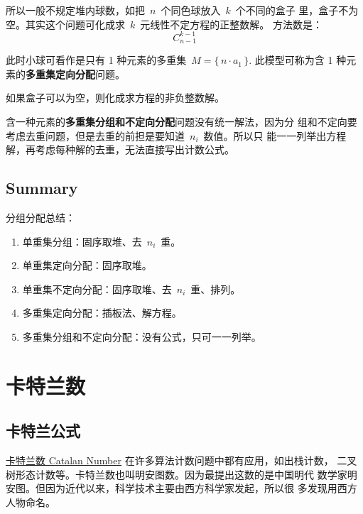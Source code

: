 所以一般不规定堆内球数，如把~$n$~个同色球放入~$k$~个不同的盒子
里，盒子不为空。其实这个问题可化成求~$k$~元线性不定方程的正整数解。
方法数是：
\[ C_{n - 1}^{k - 1}\]

此时小球可看作是只有 1 种元素的多重集~$M = \{\, n \cdot a_1\, \}$.
此模型可称为含 1 种元素的\textbf{多重集定向分配}问题。

如果盒子可以为空，则化成求方程的非负整数解。

含一种元素的\textbf{多重集分组和不定向分配}问题没有统一解法，因为分
组和不定向要考虑去重问题，但是去重的前担是要知道~$n_i$~数值。所以只
能一一列举出方程解，再考虑每种解的去重，无法直接写出计数公式。

\section{Summary}

分组分配总结：

\begin{minipage}{1.0\linewidth}
  \begin{enumerate}
  \item 单重集分组：固序取堆、去~$n_i$~重。
  \item 单重集定向分配：固序取堆。
  \item 单重集不定向分配：固序取堆、去~$n_i$~重、排列。
  \item 多重集定向分配：插板法、解方程。
  \item 多重集分组和不定向分配：没有公式，只可一一列举。
  \end{enumerate}
\end{minipage}


\chapter{卡特兰数}
\label{cha:catalan-number}

\section{卡特兰公式}

\href{https://zh.wikipedia.org/zh-hans/\%E5\%8D\%A1\%E5\%A1\%94\%E5\%85\%B0\%E6\%95\%B0}{
  卡特兰数 Catalan Number} 在许多算法计数问题中都有应用，如出栈计数，
二叉树形态计数等。卡特兰数也叫明安图数。因为最提出这数的是中国明代
数学家明安图。但因为近代以来，科学技术主要由西方科学家发起，所以很
多发现用西方人物命名。

